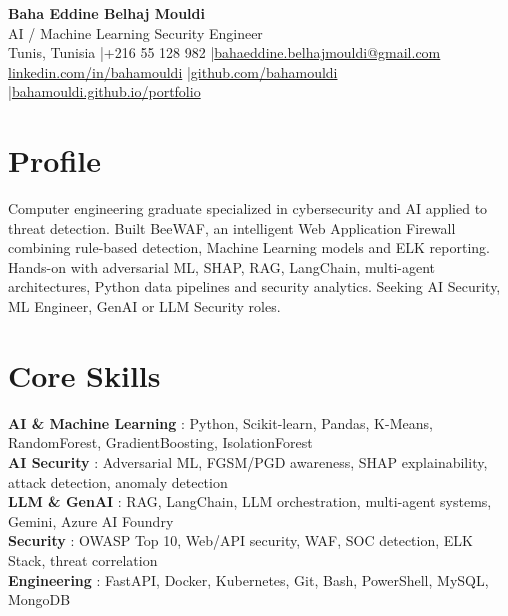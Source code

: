 \documentclass[a4paper,10pt]{article}
\begin{document}
\begin{center}
{\LARGE\bfseries\color{navy} Baha Eddine Belhaj Mouldi}\\[4pt]
{\large AI / Machine Learning Security Engineer}\\[6pt]
Tunis, Tunisia \quad|\quad +216 55 128 982 \quad|\quad \href{mailto:bahaeddine.belhajmouldi@gmail.com}{bahaeddine.belhajmouldi@gmail.com}\\[2pt]
\href{https://www.linkedin.com/in/bahamouldi}{linkedin.com/in/bahamouldi} \quad|\quad \href{https://github.com/bahamouldi}{github.com/bahamouldi} \quad|\quad \href{https://bahamouldi.github.io/portfolio/}{bahamouldi.github.io/portfolio}
\end{center}
\vspace{3pt}
\section{Profile}
Computer engineering graduate specialized in cybersecurity and AI applied to threat detection. Built BeeWAF, an intelligent Web Application Firewall combining rule-based detection, Machine Learning models and ELK reporting. Hands-on with adversarial ML, SHAP, RAG, LangChain, multi-agent architectures, Python data pipelines and security analytics. Seeking AI Security, ML Engineer, GenAI or LLM Security roles.
\section{Core Skills}
\textbf{AI \& Machine Learning} : Python, Scikit-learn, Pandas, K-Means, RandomForest, GradientBoosting, IsolationForest\\[1pt]
\textbf{AI Security} : Adversarial ML, FGSM/PGD awareness, SHAP explainability, attack detection, anomaly detection\\[1pt]
\textbf{LLM \& GenAI} : RAG, LangChain, LLM orchestration, multi-agent systems, Gemini, Azure AI Foundry\\[1pt]
\textbf{Security} : OWASP Top 10, Web/API security, WAF, SOC detection, ELK Stack, threat correlation\\[1pt]
\textbf{Engineering} : FastAPI, Docker, Kubernetes, Git, Bash, PowerShell, MySQL, MongoDB
\end{document}
